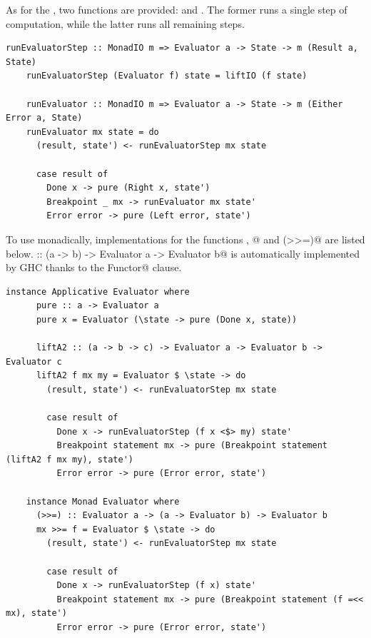 \documentclass[UdineBachThesis,american,11pt]{PhdThesis}
\begin{document}
  As for the \lstinline@Evaluator@, two functions are provided:
  \lstinline@runEvaluatorStep@ and \lstinline@runEvaluator@. The former runs a
  single step of computation, while the latter runs all remaining steps.

  \begin{lstlisting}[gobble=4,basicstyle=\ttfamily\small]
    runEvaluatorStep :: MonadIO m => Evaluator a -> State -> m (Result a, State)
    runEvaluatorStep (Evaluator f) state = liftIO (f state)

    runEvaluator :: MonadIO m => Evaluator a -> State -> m (Either Error a, State)
    runEvaluator mx state = do
      (result, state') <- runEvaluatorStep mx state

      case result of
        Done x -> pure (Right x, state')
        Breakpoint _ mx -> runEvaluator mx state'
        Error error -> pure (Left error, state')
  \end{lstlisting}

  To use \lstinline@Evaluator@s monadically, implementations for the functions
  \lstinline@pure@, @ and \lstinline@(>>=)@ are listed below.
  \lstinline@fmap :: (a -> b) -> Evaluator a -> Evaluator b@ is automatically
  implemented by GHC thanks to the \lstinline@deriving Functor@ clause.

  \begin{lstlisting}[gobble=4,basicstyle=\ttfamily\small]
    instance Applicative Evaluator where
      pure :: a -> Evaluator a
      pure x = Evaluator (\state -> pure (Done x, state))

      liftA2 :: (a -> b -> c) -> Evaluator a -> Evaluator b -> Evaluator c
      liftA2 f mx my = Evaluator $ \state -> do
        (result, state') <- runEvaluatorStep mx state

        case result of
          Done x -> runEvaluatorStep (f x <$> my) state'
          Breakpoint statement mx -> pure (Breakpoint statement (liftA2 f mx my), state')
          Error error -> pure (Error error, state')

    instance Monad Evaluator where
      (>>=) :: Evaluator a -> (a -> Evaluator b) -> Evaluator b
      mx >>= f = Evaluator $ \state -> do
        (result, state') <- runEvaluatorStep mx state

        case result of
          Done x -> runEvaluatorStep (f x) state'
          Breakpoint statement mx -> pure (Breakpoint statement (f =<< mx), state')
          Error error -> pure (Error error, state')
  \end{lstlisting}
\end{document}
